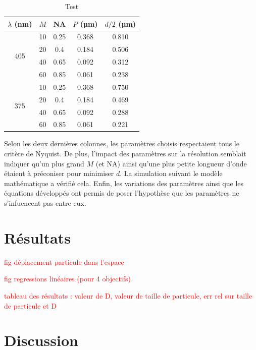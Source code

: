 \documentclass[conference]{IEEEtran}
\begin{document}
\begin{table}[!ht]
    \centering
    \caption{Test}
    \begin{tabular}{|c|cc||c|c|}
    \hline
        $\lambda$ (nm) & $M$ & NA & $P$ (µm) & $d/2$ (µm) \\ \hline\hline
        \multirow{4}{*}{405} & 10 & 0.25 & 0.368 & 0.810 \\ \cline{2-5}
                             & 20 & 0.4  & 0.184 & 0.506 \\ \cline{2-5}
                             & 40 & 0.65 & 0.092 & 0.312 \\ \cline{2-5}
                             & 60 & 0.85 & 0.061 & 0.238 \\ \hline
        \multirow{4}{*}{375} & 10 & 0.25 & 0.368 & 0.750 \\ \cline{2-5}
                             & 20 & 0.4  & 0.184 & 0.469 \\ \cline{2-5}
                             & 40 & 0.65 & 0.092 & 0.288 \\ \cline{2-5}
                             & 60 & 0.85 & 0.061 & 0.221 \\ \hline
    \end{tabular}
\label{tableau_nyq}
\end{table}

Selon les deux dernières colonnes, les paramètres choisis respectaient tous le critère de Nyquist.
De plus, l'impact des paramètres sur la résolution semblait indiquer qu'un plus grand $M$ (et NA)
ainsi qu'une plus petite longueur d'onde étaient à préconiser pour minimiser $d$. La simulation suivant
le modèle mathématique a vérifié cela. Enfin, les variations des paramètres ainsi que les équations
développés ont permis de poser l'hypothèse que les paramètres ne s'infuencent pas entre eux.


\section{Résultats \label{resultats}}

\textcolor{red}{fig déplacement particule dans l'espace}

\textcolor{red}{fig regressions linéaires (pour 4 objectifs)}

\textcolor{red}{tableau des résultats : valeur de D, valeur de taille de particule, err rel sur taille de particule et D}



\section{Discussion}
\end{document}
